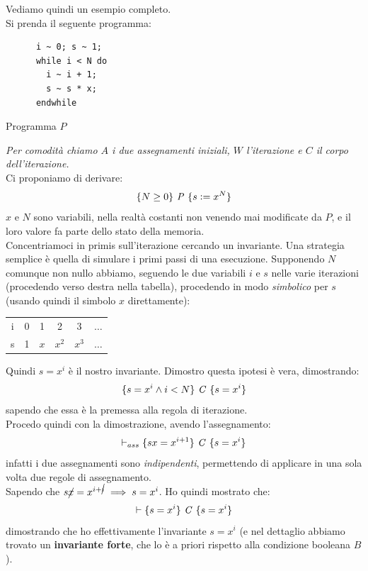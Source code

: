 \documentclass[a4paper,12pt, oneside]{book}
\def\cceq{\mathrel{\vcenter{\hbox{:}}{=}}}
\begin{document}
\begin{esempio}
  Vediamo quindi un esempio completo.\\
  Si prenda il seguente programma:
  \begin{listing}[H]
    \begin{lstlisting}
      i ~ 0; s ~ 1;
      while i < N do
        i ~ i + 1;
        s ~ s * x;
      endwhile  
    \end{lstlisting}
    \caption{Programma $P$}
    \label{E:W}
  \end{listing}
  \textit{Per comodità chiamo $A$ i due assegnamenti iniziali,
      $W$ l'iterazione e $C$ il corpo dell'iterazione.}\\
  Ci proponiamo di derivare:
  \[\{N\geq 0\}\mbox{ \textit{P} }\{s\cceq x^N\}\]
  $x$ e $N$ sono variabili, nella realtà costanti non venendo mai modificate da
  $P$, e il loro valore fa parte dello stato della memoria.\\
  Concentriamoci in primis sull'iterazione cercando un invariante. Una strategia
  semplice è quella di simulare i primi passi di una esecuzione. Supponendo $N$
  comunque non nullo abbiamo, seguendo le due variabili $i$ e $s$ nelle varie
  iterazioni (procedendo verso destra nella tabella), procedendo in modo
  \textit{simbolico} per $s$ (usando quindi il simbolo $x$ direttamente):
  \begin{table}[H]
    \centering
    \begin{tabular}[H]{c|ccccc}
      i & 0 & 1 & 2 & 3 & $\ldots$\\
      s & 1 & $x$ & $x^2$ & $x^3$ & $\ldots$
    \end{tabular}
  \end{table}
  Quindi $s= x^i$ è il nostro invariante. Dimostro questa ipotesi è vera,
  dimostrando:
  \[\{s=x^i\land i<N\}\mbox{ \textit{C} }\{s=x^i\}\]
  sapendo che essa è la premessa alla regola di iterazione.\\
  Procedo quindi con la dimostrazione, avendo l'assegnamento:
  \[\vdash_{ass}\{sx=x^{i+1}\}\mbox{ \textit{C} }\{s=x^i\}\]
  infatti i due assegnamenti sono \emph{indipendenti}, permettendo di applicare
  in una sola volta due regole di assegnamento.\\
  Sapendo che $s\cancel{x}=x^{i+\cancel{i}}\implies s=x^i$. Ho quindi mostrato
  che:
  \[\vdash \{s=x^i\}\mbox{ \textit{C} }\{s=x^i\}\]
  dimostrando che ho effettivamente l'invariante $s= x^i$ (e nel dettaglio
  abbiamo trovato un \textbf{invariante forte}, che lo è a priori rispetto alla
  condizione booleana $B$).\\

\end{esempio}
\end{document}
